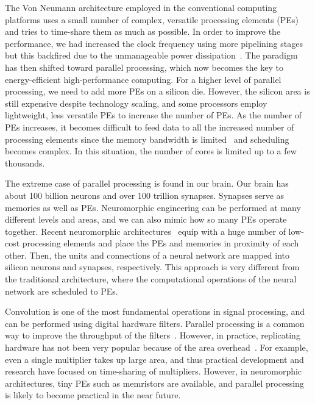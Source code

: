 \documentclass[journal]{IEEEtran}
\begin{document}
The Von Neumann architecture employed in the conventional computing platforms uses a small number of complex, versatile processing elements (PEs) and tries to time-share them as much as possible. In order to improve the performance, we had increased the clock frequency using more pipelining stages but this backfired due to the unmanageable power dissipation~\cite{parkhurst2006single}. The paradigm has then shifted toward parallel processing, which now becomes the key to energy-efficient high-performance computing. For a higher level of parallel processing, we need to add more PEs on a silicon die. However, the silicon area is still expensive despite technology scaling, and some processors employ lightweight, less versatile PEs to increase the number of PEs. As the number of PEs increases, it becomes difficult to feed data to all the increased number of processing elements since the memory bandwidth is limited~\cite{burger1996memory} and scheduling becomes complex. In this situation, the number of cores is limited up to a few thousands. 

The extreme case of parallel processing is found in our brain. Our brain has about 100 billion neurons and over 100 trillion synapses. Synapses serve as memories as well as PEs. Neuromorphic engineering can be performed at many different levels and areas, and we can also mimic how so many PEs operate together. Recent neuromorphic architectures~\cite{merolla2014million,chung2015insight} equip with a huge number of low-cost processing elements and place the PEs and memories in proximity of each other. Then, the units and connections of a neural network are mapped into silicon neurons and synapses, respectively. This approach is very different from the traditional architecture, where the computational operations of the neural network are scheduled to PEs.

Convolution is one of the most fundamental operations in signal processing, and can be performed using digital hardware filters. Parallel processing is a common way to improve the throughput of the filters~\cite{parhi2007vlsi}. However, in practice, replicating hardware has not been very popular  because of the area overhead~\cite{tsao2012area}. For example, even a single multiplier takes up large area, and thus practical development and research have focused on time-sharing of multipliers. However, in neuromorphic architectures, tiny PEs such as memristors are available, and parallel processing is likely to become practical in the near future. 
\end{document}
